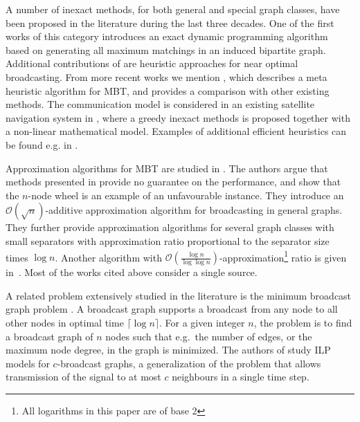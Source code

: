 A number of inexact methods, for both general and special graph classes, have been proposed in the literature during the last three decades.
One of the first works of this category \cite{scheuermann84} 
introduces an exact dynamic programming algorithm based on generating all maximum matchings in an induced bipartite graph.
Additional contributions of \cite{scheuermann84} are heuristic approaches for near optimal broadcasting.
From more recent works we mention \cite{hasson04}, which describes a meta heuristic algorithm for MBT, and provides a comparison with other existing methods.
The communication model is considered in an existing satellite navigation system in \cite{chu17}, where a greedy inexact methods is proposed together with a non-linear mathematical model.
Examples of additional efficient heuristics can be found e.g. in \cite{harutyunyan06,harutyunyan14,wang10,jimborean13}.

Approximation algorithms for MBT are studied in \cite{kortsarz95}. 
The authors argue that methods presented in \cite{scheuermann84} provide no guarantee on the performance, and show that the $n$-node wheel is an example of an unfavourable instance.
They introduce an $\mathcal{O}(\sqrt{n})$-additive approximation algorithm for broadcasting in general graphs.
They further provide approximation algorithms for several graph classes with small separators with approximation ratio proportional to the separator size times $\log n$.
Another algorithm with $\mathcal{O}\left(\frac{\log n}{\log \log n}\right)$-approximation\footnote{All logarithms in this paper are of base 2} ratio is given in~\cite{elkin03}.
Most of the works cited above consider a single source.

A related problem extensively studied in the literature is the minimum broadcast graph problem \cite{grigni91,mcgarvey16}. 
A broadcast graph supports a broadcast from any node to all other nodes in optimal time $\lceil\log n\rceil$.
For a given integer $n$, the problem is to find a broadcast graph of $n$ nodes such that e.g.\ the number of edges, or the maximum node degree, in the graph is minimized.
The authors of \cite{mcgarvey16} study ILP models for $c$-broadcast graphs, a generalization of the problem that allows transmission of the signal to at most $c$ neighbours in a single time step.


